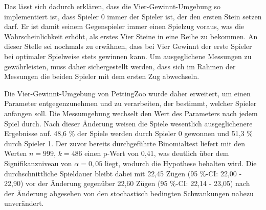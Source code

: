 Das lässt sich dadurch erklären, dass die Vier-Gewinnt-Umgebung so implementiert ist, dass Spieler 0 immer der Spieler ist, der den ersten Stein setzen darf. Er ist damit seinem Gegenspieler immer einen Spielzug voraus, was die Wahrscheinlichkeit erhöht, als erstes Vier Steine in eine Reihe zu bekommen. An dieser Stelle sei nochmals zu erwähnen, dass bei Vier Gewinnt der erste Spieler bei optimaler Spielweise stets gewinnen kann. Um ausgeglichene Messungen zu gewährleisten, muss daher sichergestellt werden, dass sich im Rahmen der Messungen die beiden Spieler mit dem ersten Zug abwechseln.

Die Vier-Gewinnt-Umgebung von PettingZoo wurde daher erweitert, um einen Parameter entgegenzunehmen und zu verarbeiten, der bestimmt, welcher Spieler anfangen soll. Die Messumgebung wechselt den Wert des Parameters nach jedem Spiel durch. Nach dieser Änderung weisen die Spiele wesentlich ausgeglichenere Ergebnisse auf. 48,6 \% der Spiele werden durch Spieler 0 gewonnen und 51,3 \% durch Spieler 1. Der zuvor bereits durchgeführte Binomialtest liefert mit den Werten $n = 999$, $k = 486$ einen p-Wert von 0,41, was deutlich über dem Signifikanzniveau von $\alpha = 0,05$ liegt, wodurch die Hypothese behalten wird. Die durchschnittliche Spieldauer bleibt dabei mit 22,45 Zügen (95 \%-CI: 22,00 - 22,90) vor der Änderung gegenüber 22,60 Zügen (95 \%-CI: 22,14 - 23,05) nach der Änderung abgesehen von den stochastisch bedingten Schwankungen nahezu unverändert.

